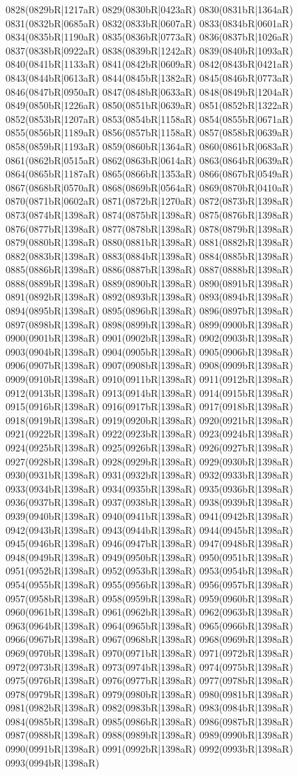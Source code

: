 0828(0829bR|1217aR) 0829(0830bR|0423aR) 0830(0831bR|1364aR) 0831(0832bR|0685aR) 0832(0833bR|0607aR) 0833(0834bR|0601aR) 0834(0835bR|1190aR) 0835(0836bR|0773aR) 0836(0837bR|1026aR) 0837(0838bR|0922aR) 0838(0839bR|1242aR) 0839(0840bR|1093aR) 0840(0841bR|1133aR) 0841(0842bR|0609aR) 0842(0843bR|0421aR) 0843(0844bR|0613aR) 0844(0845bR|1382aR) 0845(0846bR|0773aR) 0846(0847bR|0950aR) 0847(0848bR|0633aR) 0848(0849bR|1204aR) 0849(0850bR|1226aR) 0850(0851bR|0639aR) 0851(0852bR|1322aR) 0852(0853bR|1207aR) 0853(0854bR|1158aR) 0854(0855bR|0671aR) 0855(0856bR|1189aR) 0856(0857bR|1158aR) 0857(0858bR|0639aR) 0858(0859bR|1193aR) 0859(0860bR|1364aR) 0860(0861bR|0683aR) 0861(0862bR|0515aR) 0862(0863bR|0614aR) 0863(0864bR|0639aR) 0864(0865bR|1187aR) 0865(0866bR|1353aR) 0866(0867bR|0549aR) 0867(0868bR|0570aR) 0868(0869bR|0564aR) 0869(0870bR|0410aR) 0870(0871bR|0602aR) 0871(0872bR|1270aR) 0872(0873bR|1398aR) 0873(0874bR|1398aR) 0874(0875bR|1398aR) 0875(0876bR|1398aR) 0876(0877bR|1398aR) 0877(0878bR|1398aR) 0878(0879bR|1398aR) 0879(0880bR|1398aR) 0880(0881bR|1398aR) 0881(0882bR|1398aR) 0882(0883bR|1398aR) 0883(0884bR|1398aR) 0884(0885bR|1398aR) 0885(0886bR|1398aR) 0886(0887bR|1398aR) 0887(0888bR|1398aR) 0888(0889bR|1398aR) 0889(0890bR|1398aR) 0890(0891bR|1398aR) 0891(0892bR|1398aR) 0892(0893bR|1398aR) 0893(0894bR|1398aR) 0894(0895bR|1398aR) 0895(0896bR|1398aR) 0896(0897bR|1398aR) 0897(0898bR|1398aR) 0898(0899bR|1398aR) 0899(0900bR|1398aR) 0900(0901bR|1398aR) 0901(0902bR|1398aR) 0902(0903bR|1398aR) 0903(0904bR|1398aR) 0904(0905bR|1398aR) 0905(0906bR|1398aR) 0906(0907bR|1398aR) 0907(0908bR|1398aR) 0908(0909bR|1398aR) 0909(0910bR|1398aR) 0910(0911bR|1398aR) 0911(0912bR|1398aR) 0912(0913bR|1398aR) 0913(0914bR|1398aR) 0914(0915bR|1398aR) 0915(0916bR|1398aR) 0916(0917bR|1398aR) 0917(0918bR|1398aR) 0918(0919bR|1398aR) 0919(0920bR|1398aR) 0920(0921bR|1398aR) 0921(0922bR|1398aR) 0922(0923bR|1398aR) 0923(0924bR|1398aR) 0924(0925bR|1398aR) 0925(0926bR|1398aR) 0926(0927bR|1398aR) 0927(0928bR|1398aR) 0928(0929bR|1398aR) 0929(0930bR|1398aR) 0930(0931bR|1398aR) 0931(0932bR|1398aR) 0932(0933bR|1398aR) 0933(0934bR|1398aR) 0934(0935bR|1398aR) 0935(0936bR|1398aR) 0936(0937bR|1398aR) 0937(0938bR|1398aR) 0938(0939bR|1398aR) 0939(0940bR|1398aR) 0940(0941bR|1398aR) 0941(0942bR|1398aR) 0942(0943bR|1398aR) 0943(0944bR|1398aR) 0944(0945bR|1398aR) 0945(0946bR|1398aR) 0946(0947bR|1398aR) 0947(0948bR|1398aR) 0948(0949bR|1398aR) 0949(0950bR|1398aR) 0950(0951bR|1398aR) 0951(0952bR|1398aR) 0952(0953bR|1398aR) 0953(0954bR|1398aR) 0954(0955bR|1398aR) 0955(0956bR|1398aR) 0956(0957bR|1398aR) 0957(0958bR|1398aR) 0958(0959bR|1398aR) 0959(0960bR|1398aR) 0960(0961bR|1398aR) 0961(0962bR|1398aR) 0962(0963bR|1398aR) 0963(0964bR|1398aR) 0964(0965bR|1398aR) 0965(0966bR|1398aR) 0966(0967bR|1398aR) 0967(0968bR|1398aR) 0968(0969bR|1398aR) 0969(0970bR|1398aR) 0970(0971bR|1398aR) 0971(0972bR|1398aR) 0972(0973bR|1398aR) 0973(0974bR|1398aR) 0974(0975bR|1398aR) 0975(0976bR|1398aR) 0976(0977bR|1398aR) 0977(0978bR|1398aR) 0978(0979bR|1398aR) 0979(0980bR|1398aR) 0980(0981bR|1398aR) 0981(0982bR|1398aR) 0982(0983bR|1398aR) 0983(0984bR|1398aR) 0984(0985bR|1398aR) 0985(0986bR|1398aR) 0986(0987bR|1398aR) 0987(0988bR|1398aR) 0988(0989bR|1398aR) 0989(0990bR|1398aR) 0990(0991bR|1398aR) 0991(0992bR|1398aR) 0992(0993bR|1398aR) 0993(0994bR|1398aR) 